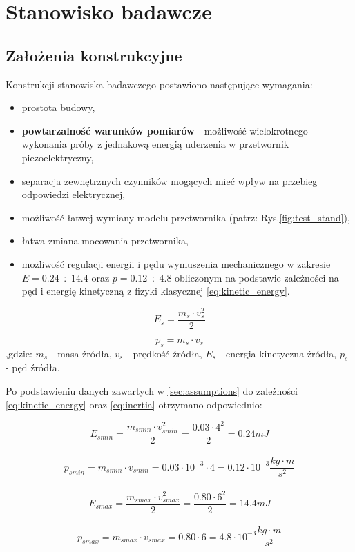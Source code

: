 \chapter{Stanowisko badawcze}
\label{sec:test_stand}

\section{Założenia konstrukcyjne}
\label{sec:stand_assumptions}

Konstrukcji stanowiska badawczego postawiono następujące wymagania:
\begin{itemize}
\item prostota budowy,
\item \textbf{powtarzalność warunków pomiarów} - możliwość wielokrotnego wykonania 
próby z jednakową energią uderzenia w przetwornik piezoelektryczny,
\item separacja zewnętrznych czynników mogących mieć wpływ na przebieg odpowiedzi 
elektrycznej,
\item możliwość łatwej wymiany modelu przetwornika (patrz: Rys.\ref{fig:test_stand}),
\item łatwa zmiana mocowania przetwornika,
\item możliwość regulacji energii i pędu wymuszenia mechanicznego w zakresie
 \textbf{$E = 0.24\div14.4$} oraz \textbf{$p = 0.12\div4.8$} obliczonym na podstawie 
 zależności na pęd i energię kinetyczną z fizyki klasycznej \ref{eq:kinetic_energy}.
\end{itemize}

\begin{equation}
E_{s} = \frac{m_{s} \cdot v_{s}^2}{2}
\label{eq:kinetic_energy}
\end{equation}

\begin{equation}
p_{s} = m_{s} \cdot v_{s}
\label{eq:inertia}
\end{equation}
,gdzie: $ m_s$ - masa źródła, $v_s$ - prędkość źródła, $E_s$ - energia kinetyczna źródła, $p_s$ - pęd źródła.

Po podstawieniu danych zawartych w \ref{sec:assumptions} do zależności 
\ref{eq:kinetic_energy} oraz \ref{eq:inertia} otrzymano odpowiednio:


$$E_{smin} = \frac{m_{smin} \cdot v_{smin}^2}{2}=\frac{{0.03}\cdot4^2}{2} = {0.24} mJ$$
\\$$p_{smin} = m_{smin} \cdot v_{smin} = {0.03}\cdot 10^{-3} \cdot 4 = {0.12} \cdot 10^{-3}\frac{kg \cdot m}{s^2}$$
\\$$E_{smax} = \frac{m_{smax} \cdot v_{smax}^2}{2}=\frac{0.80\cdot6^2}{2} = 14.4 mJ$$
\\$$p_{smax} = m_{smax} \cdot v_{smax} = 0.80 \cdot 6 = 4.8 \cdot 10^{-3} \frac{kg \cdot m}{s^2}$$


